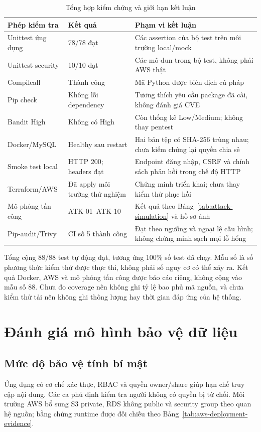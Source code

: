 \begin{table}[htbp]\centering\small
\caption{Tổng hợp kiểm chứng và giới hạn kết luận}
\begin{tabularx}{\textwidth}{P{3.3cm}P{2.5cm}X}\toprule
\textbf{Phép kiểm tra}&\textbf{Kết quả}&\textbf{Phạm vi kết luận}\\\midrule
Unittest ứng dụng & 78/78 đạt & Các assertion của bộ test trên môi trường local/mock\\
Unittest security & 10/10 đạt & Các mô-đun trong bộ test, không phải AWS thật\\
Compileall & Thành công & Mã Python được biên dịch cú pháp\\
Pip check & Không lỗi dependency & Tương thích yêu cầu package đã cài, không đánh giá CVE\\
Bandit High & Không có High & Còn thống kê Low/Medium; không thay pentest\\
Docker/MySQL & Healthy sau restart & Hai bản tệp có SHA-256 trùng nhau; chưa kiểm chứng lại quyền chia sẻ\\
Smoke test local & HTTP 200; headers đạt & Endpoint đăng nhập, CSRF và chính sách phản hồi trong chế độ HTTP\\
Terraform/AWS & Đã apply môi trường thử nghiệm & Chứng minh triển khai; chưa thay kiểm thử phục hồi\\
Mô phỏng tấn công & ATK-01--ATK-10 & Kết quả theo Bảng~\ref{tab:attack-simulation} và hồ sơ ảnh\\
Pip-audit/Trivy & CI số 5 thành công & Đạt theo ngưỡng và ngoại lệ cấu hình; không chứng minh sạch mọi lỗ hổng\\\bottomrule
\end{tabularx}\end{table}
Tổng cộng 88/88 test tự động đạt, tương ứng 100\% số test đã chạy. Mẫu số là số phương thức kiểm thử được thực thi, không phải số nguy cơ có thể xảy ra. Kết quả Docker, AWS và mô phỏng tấn công được báo cáo riêng, không cộng vào mẫu số 88. Chưa đo coverage nên không ghi tỷ lệ bao phủ mã nguồn, và chưa kiểm thử tải nên không ghi thông lượng hay thời gian đáp ứng của hệ thống.

\section{Đánh giá mô hình bảo vệ dữ liệu}
\subsection{Mức độ bảo vệ tính bí mật}
Ứng dụng có cơ chế xác thực, RBAC và quyền owner/share giúp hạn chế truy cập nội dung. Các ca phủ định kiểm tra người không có quyền bị từ chối. Môi trường AWS bổ sung S3 private, RDS không public và security group theo quan hệ nguồn; bằng chứng runtime được đối chiếu theo Bảng~\ref{tab:aws-deployment-evidence}.

